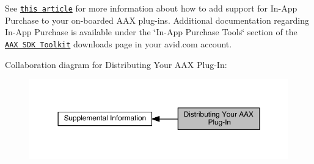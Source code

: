  See \href{https://dev.avid.com/MP_DeveloperForumAnnouncement?AnnouncementId=aBe3100000002bMCAQ}{\tt this article} for more information about how to add support for In-\/\+App Purchase to your on-\/boarded A\+A\+X plug-\/ins. Additional documentation regarding In-\/\+App Purchase is available under the \char`\"{}\+In-\/\+App Purchase Tools\char`\"{} section of the \href{https://my.avid.com/products/cppsdk}{\tt A\+A\+X S\+D\+K Toolkit} downloads page in your avid.\+com account.

 Collaboration diagram for Distributing Your A\+A\+X Plug-\/\+In\+:
\nopagebreak
\begin{figure}[H]
\begin{center}
\leavevmode
\includegraphics[width=350pt]{a00372}
\end{center}
\end{figure}
